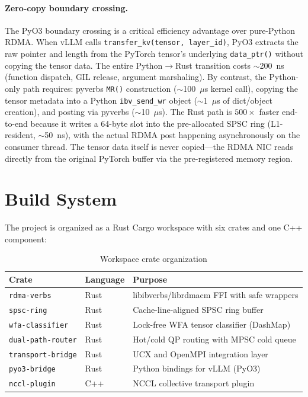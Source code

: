 \documentclass[11pt,letterpaper]{article}
\begin{document}
\paragraph{Zero-copy boundary crossing.}
The PyO3 boundary crossing is a critical efficiency advantage over pure-Python RDMA. When vLLM calls \texttt{transfer\_kv(tensor, layer\_id)}, PyO3 extracts the raw pointer and length from the PyTorch tensor's underlying \texttt{data\_ptr()} without copying the tensor data. The entire Python$\to$Rust transition costs ${\sim}$200~ns (function dispatch, GIL release, argument marshaling). By contrast, the Python-only path requires: pyverbs \texttt{MR()} construction (${\sim}$100~$\mu$s kernel call), copying the tensor metadata into a Python \texttt{ibv\_send\_wr} object (${\sim}$1~$\mu$s of dict/object creation), and posting via pyverbs (${\sim}$10~$\mu$s). The Rust path is $500\times$ faster end-to-end because it writes a 64-byte slot into the pre-allocated SPSC ring (L1-resident, ${\sim}$50~ns), with the actual RDMA post happening asynchronously on the consumer thread. The tensor data itself is never copied---the RDMA NIC reads directly from the original PyTorch buffer via the pre-registered memory region.

\section{Build System}

The project is organized as a Rust Cargo workspace with six crates and one C++ component:

\begin{table}[htbp]
\centering
\caption{Workspace crate organization}
\label{tab:workspace-crates}
\begin{tabular}{@{}llp{6.5cm}@{}}
\toprule
\textbf{Crate} & \textbf{Language} & \textbf{Purpose} \\
\midrule
\texttt{rdma-verbs} & Rust & libibverbs/librdmacm FFI with safe wrappers \\
\texttt{spsc-ring} & Rust & Cache-line-aligned SPSC ring buffer \\
\texttt{wfa-classifier} & Rust & Lock-free WFA tensor classifier (DashMap) \\
\texttt{dual-path-router} & Rust & Hot/cold QP routing with MPSC cold queue \\
\texttt{transport-bridge} & Rust & UCX and OpenMPI integration layer \\
\texttt{pyo3-bridge} & Rust & Python bindings for vLLM (PyO3) \\
\texttt{nccl-plugin} & C++ & NCCL collective transport plugin \\
\bottomrule
\end{tabular}
\end{table}
\end{document}
